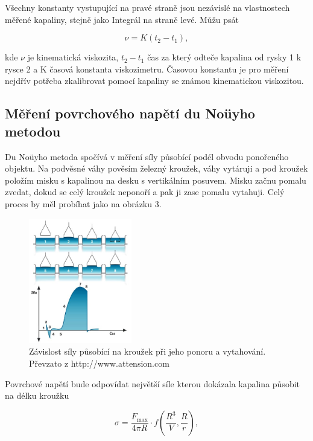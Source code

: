 \documentclass[a4paper,11pt]{article}
\begin{document}
Všechny konstanty vystupující na pravé straně jsou nezávislé na vlastnostech měřené kapaliny, stejně jako Integrál na straně levé. Můžu psát

\begin{equation}
\nu = K(t_2-t_1),
\end{equation}

kde $\nu$ je kinematická viskozita, $t_2-t_1$ čas za který odteče kapalina od rysky 1 k rysce 2 a K časová konstanta viskozimetru. Časovou konstantu je pro měření nejdřív potřeba zkalibrovat pomocí kapaliny se známou kinematickou viskozitou.

\subsection{Měření povrchového napětí du Noüyho metodou}

Du Noüyho metoda spočívá v měření síly působící podél obvodu ponořeného objektu. Na podvěsné váhy pověsím železný kroužek, váhy vytáruji a pod kroužek položím misku s kapalinou na desku s vertikálním posuvem. Misku začnu pomalu zvedat, dokud se celý kroužek neponoří a pak ji zase pomalu vytahuji. Celý proces by měl probíhat jako na obrázku 3.

\begin{figure}[htpb]
  \centering
  \includegraphics[width=0.4\textwidth]{nouyh.jpg}
  \caption{Závislost síly působící na kroužek při jeho ponoru a vytahování. Převzato
z http://www.attension.com}
\end{figure}

Povrchové napětí bude odpovídat největší síle kterou dokázala kapalina působit na délku kroužku

\begin{equation}
\sigma = \frac{F_{\text{max}}}{4 \pi R} \cdot f (\frac{R^3}{V}, \frac{R}{r}),
\end{equation}
\end{document}
